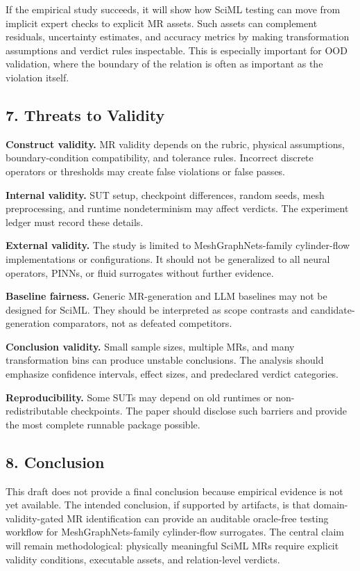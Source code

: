 If the empirical study succeeds, it will show how SciML testing can move
from implicit expert checks to explicit MR assets. Such assets can
complement residuals, uncertainty estimates, and accuracy metrics by
making transformation assumptions and verdict rules inspectable. This is
especially important for OOD validation, where the boundary of the
relation is often as important as the violation itself.

\subsection{7. Threats to Validity}\label{threats-to-validity}

\textbf{Construct validity.} MR validity depends on the rubric, physical
assumptions, boundary-condition compatibility, and tolerance rules.
Incorrect discrete operators or thresholds may create false violations
or false passes.

\textbf{Internal validity.} SUT setup, checkpoint differences, random
seeds, mesh preprocessing, and runtime nondeterminism may affect
verdicts. The experiment ledger must record these details.

\textbf{External validity.} The study is limited to MeshGraphNets-family
cylinder-flow implementations or configurations. It should not be
generalized to all neural operators, PINNs, or fluid surrogates without
further evidence.

\textbf{Baseline fairness.} Generic MR-generation and LLM baselines may
not be designed for SciML. They should be interpreted as scope contrasts
and candidate-generation comparators, not as defeated competitors.

\textbf{Conclusion validity.} Small sample sizes, multiple MRs, and many
transformation bins can produce unstable conclusions. The analysis
should emphasize confidence intervals, effect sizes, and predeclared
verdict categories.

\textbf{Reproducibility.} Some SUTs may depend on old runtimes or
non-redistributable checkpoints. The paper should disclose such barriers
and provide the most complete runnable package possible.

\subsection{8. Conclusion}\label{conclusion-1}

This draft does not provide a final conclusion because empirical
evidence is not yet available. The intended conclusion, if supported by
artifacts, is that domain-validity-gated MR identification can provide
an auditable oracle-free testing workflow for MeshGraphNets-family
cylinder-flow surrogates. The central claim will remain methodological:
physically meaningful SciML MRs require explicit validity conditions,
executable assets, and relation-level verdicts.

